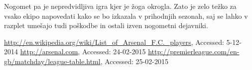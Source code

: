 \documentclass[11pt,a4paper]{article}
\begin{document}
Nogomet pa je nepredvidljiva igra kjer je žoga okrogla. Zato je zelo težko za vsako ekipo napovedati kako se bo izkazala v prihodnjih sezonah, saj se lahko v razplet umešajo tudi poškodbe in ostali izven nogometni dejavniki.

\begin{thebibliography}{9}

  \url{http://en.wikipedia.org/wiki/List_of_Arsenal_F.C._players},
  {Accessed: 5-12-2014}
  \url{http://arsenal.com},
  {Accessed: 24-02-2015}
  \url{http://premierleague.com/en-gb/matchday/league-table.html},
  {Accessed: 25-02-2015}

\end{thebibliography}
  
\end{document}
